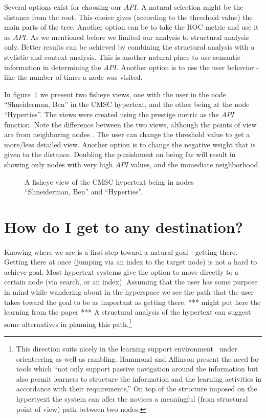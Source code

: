 \documentclass[twocolumn,10pt]{article}
\begin{document}
Several options exist for choosing our $ API$. A natural selection
might be the distance from the root. This choice gives (according to
the threshold value) the main parts of the tree. Another option can 
be to take the ROC metric and use it as $ API$. As we mentioned 
before we limited  our analysis to structural analysis only.
Better results can be achieved
by combining the structural analysis with a stylistic and context
analysis. This is another natural place to use semantic information
in determining the $ API$. Another option is to use the user behavior - like 
the number of times a node was visited. 

In figure~\ref{fig:fisheye} we 
present two fisheye views, one with the user in the 
node ``Shneiderman, Ben'' in
the CMSC hypertext, and the other being at the node ``Hyperties''.
The views were created 
using the prestige metric as the $ API$
function. Note the difference between the two views,
although the points of view are from neighboring nodes
. The user can change the threshold value to get
a more/less detailed view. Another option is to change the negative
weight that is given to the distance. Doubling the punishment on
being far will result in showing only nodes with very high $ API$
values, and the immediate neighborhood. 

\begin{figure}
\vspace*{8.75cm}
\caption [10pt] {A fisheye view of the CMSC hypertext being in 
nodes ``Shneiderman, Ben'' and ``Hyperties''.}
\label{fig:fisheye}
\end{figure}

\section{How do I get to any destination?}
\paragraph{} 
Knowing where we are is a first step toward a natural goal - getting
there. Getting there at once (jumping via an index to the target node)
is not a hard to achieve goal. Most hypertext systems give the option
to move directly to a certain node (via search, or an index). Assuming
that the user has some purpose in mind while wandering about in the
hyperspace we see the path that the user takes toward the goal to be
as important as getting there.  *** might put here the learning from
the paper *** A structural analysis of the hypertext can suggest some
alternatives in planning this path.\footnote{This direction suits
nicely in the learning support environment~\cite{ham} under
orienteering as well as rambling. Hammond and Allinson present the
need for tools which ``not only support passive navigation around the
information but also permit learners to structure the information and
the learning activities in accordance with their requirements.''  On
top of the structure imposed on the hypertyext the system can offer
the novices a meaningful (from structural point of view) path between
two nodes.}
\end{document}
